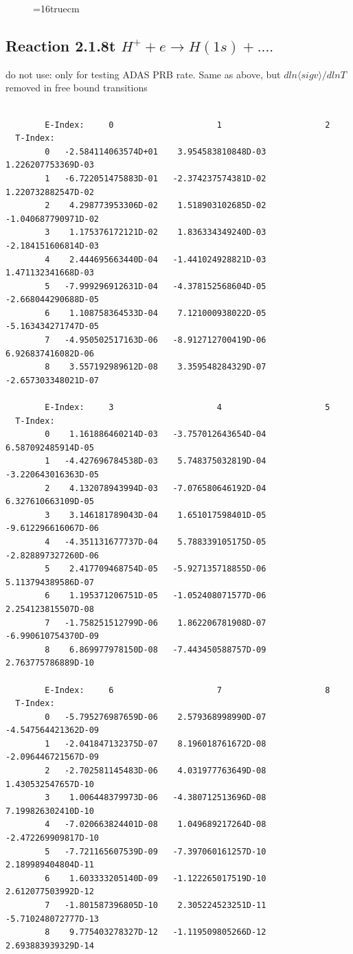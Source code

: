 \documentclass[12pt,dvips]{article}
\begin{document}
\begin{figure} \label{2.1.8r}
\epsfxsize=16truecm
\end{figure}
\newpage

\subsection{
  Reaction 2.1.8t $H^+ + e  \rightarrow H(1s) + ....$
}
     do not use: only for testing  ADAS PRB rate. Same as above,
     but $dln\langle sig v\rangle /dlnT$ removed in free bound transitions

\begin{small}\begin{verbatim}

        E-Index:     0                     1                     2
  T-Index:
        0   -2.584114063574D+01    3.954583810848D-03    1.226207753369D-03
        1   -6.722051475883D-01   -2.374237574381D-02    1.220732882547D-02
        2    4.298773953306D-02    1.518903102685D-02   -1.040687790971D-02
        3    1.175376172121D-02    1.836334349240D-03   -2.184151606814D-03
        4    2.444695663440D-04   -1.441024928821D-03    1.471132341668D-03
        5   -7.999296912631D-04   -4.378152568604D-05   -2.668044290688D-05
        6    1.108758364533D-04    7.121000938022D-05   -5.163434271747D-05
        7   -4.950502517163D-06   -8.912712700419D-06    6.926837416082D-06
        8    3.557192989612D-08    3.359548284329D-07   -2.657303348021D-07

        E-Index:     3                     4                     5
  T-Index:
        0    1.161886460214D-03   -3.757012643654D-04    6.587092485914D-05
        1   -4.427696784538D-03    5.748375032819D-04   -3.220643016363D-05
        2    4.132078943994D-03   -7.076580646192D-04    6.327610663109D-05
        3    3.146181789043D-04    1.651017598401D-05   -9.612296616067D-06
        4   -4.351131677737D-04    5.788339105175D-05   -2.828897327260D-06
        5    2.417709468754D-05   -5.927135718855D-06    5.113794389586D-07
        6    1.195371206751D-05   -1.052408071577D-06    2.254123815507D-08
        7   -1.758251512799D-06    1.862206781908D-07   -6.990610754370D-09
        8    6.869977978150D-08   -7.443450588757D-09    2.763775786889D-10

        E-Index:     6                     7                     8
  T-Index:
        0   -5.795276987659D-06    2.579368998990D-07   -4.547564421362D-09
        1   -2.041847132375D-07    8.196018761672D-08   -2.096446721567D-09
        2   -2.702581145483D-06    4.031977763649D-08    1.430532547657D-10
        3    1.006448379973D-06   -4.380712513696D-08    7.199826302410D-10
        4   -7.020663824401D-08    1.049689217264D-08   -2.472269909817D-10
        5   -7.721165607539D-09   -7.397060161257D-10    2.189989404804D-11
        6    1.603333205140D-09   -1.122265017519D-10    2.612077503992D-12
        7   -1.801587396805D-10    2.305224523251D-11   -5.710248072777D-13
        8    9.775403278327D-12   -1.119509805266D-12    2.693883939329D-14


\end{verbatim}
\end{small}
\end{document}
